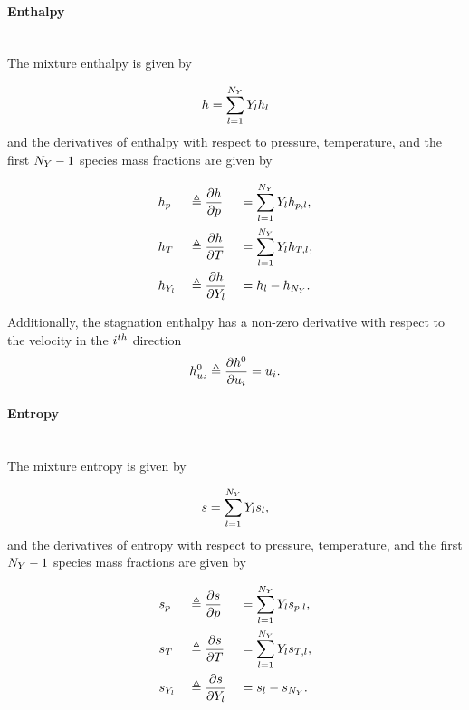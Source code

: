 \paragraph{Enthalpy} ~\\

The mixture enthalpy is given by

\begin{equation}
	h = \sum_{l = 1}^{N_Y} Y_{l} h_{l}
\end{equation}
and the derivatives of enthalpy with respect to pressure, temperature, and the first $N_Y - 1$ species mass fractions are given by

\begin{alignat}{3}
    &h_p &&\triangleq \frac{\partial h}{\partial p} &&= \sum_{l = 1}^{N_Y} Y_{l} h_{p,l}, \\
    &h_T &&\triangleq \frac{\partial h}{\partial T} &&= \sum_{l = 1}^{N_Y} Y_{l} h_{T,l}, \\
    &h_{Y_{l}} &&\triangleq \frac{\partial h}{\partial Y_{l}} &&= h_{l} - h_{N_Y}.
\end{alignat}

Additionally, the stagnation enthalpy has a non-zero derivative with respect to the velocity in the $i^{th}$ direction
\begin{equation}
	h^0_{u_{i}} \triangleq \frac{\partial h^0}{\partial u_{i}} = u_{i}.
\end{equation}

\paragraph{Entropy} ~\\

The mixture entropy is given by

\begin{equation}
	s = \sum_{l = 1}^{N_Y} Y_{l} s_{l},
\end{equation}
and the derivatives of entropy with respect to pressure, temperature, and the first $N_Y - 1$ species mass fractions are given by

\begin{alignat}{3}
    &s_p &&\triangleq \frac{\partial s}{\partial p} &&= \sum_{l = 1}^{N_Y} Y_{l} s_{p,l}, \\
    &s_T &&\triangleq \frac{\partial s}{\partial T} &&= \sum_{l = 1}^{N_Y} Y_{l} s_{T,l}, \\
    &s_{Y_{l}} &&\triangleq \frac{\partial s}{\partial Y_{l}} &&= s_{l} - s_{N_Y}.
\end{alignat}

